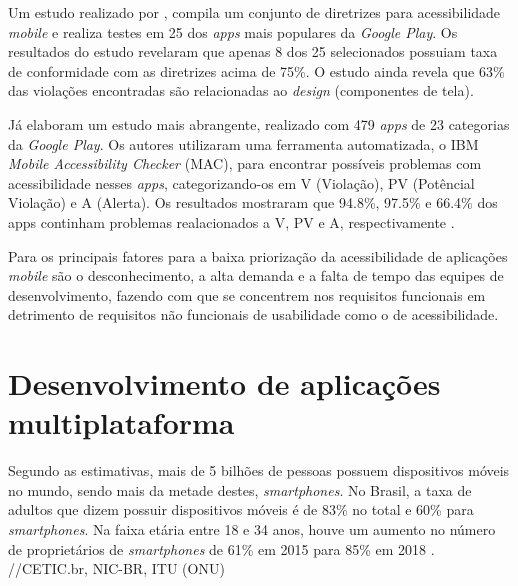 Um estudo realizado por , compila um conjunto de diretrizes para acessibilidade \textit{mobile} e realiza
testes em 25 dos \textit{apps} mais populares da \emph{Google Play}. Os resultados do estudo revelaram que apenas 8 dos 25 selecionados
possuiam taxa de conformidade com as diretrizes acima de 75\%. O estudo ainda revela que 63\% das violações encontradas são
relacionadas ao \textit{design} (componentes de tela).

Já  elaboram um estudo mais abrangente, realizado com 479
\textit{apps} de 23 categorias da \emph{Google Play}. Os autores utilizaram uma ferramenta automatizada, o IBM
\textit{Mobile Accessibility Checker} (MAC), para encontrar possíveis problemas com acessibilidade nesses \textit{apps},
categorizando-os em V (Violação), PV (Potêncial Violação) e A (Alerta). Os resultados mostraram
que 94.8\%, 97.5\% e 66.4\% dos apps continham problemas realacionados a V, PV e A, respectivamente \cite{Yan2019}.

Para  os principais fatores para a baixa priorização da acessibilidade de aplicações \textit{mobile}
são o desconhecimento, a alta demanda e a falta de tempo das equipes de desenvolvimento, fazendo com que se concentrem nos
requisitos funcionais em detrimento de requisitos não funcionais de usabilidade como o de acessibilidade.

\section{Desenvolvimento de aplicações multiplataforma}

Segundo  as estimativas, mais de 5 bilhões de pessoas possuem dispositivos móveis no mundo, sendo mais da metade destes, \textit{smartphones}.
No Brasil, a taxa de adultos que dizem possuir dispositivos móveis é de 83\% no total e 60\% para \textit{smartphones}. Na faixa etária entre 18
e 34 anos, houve um aumento no número de proprietários de \textit{smartphones} de 61\% em 2015 para 85\% em 2018 \cite{Taylor2019}. //CETIC.br, NIC-BR, ITU (ONU)
